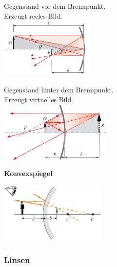 \begin{center}
	\begin{minipage}{0.3\textwidth}
		Gegenstand vor dem Brennpunkt. \\
		Erzeugt reeles Bild. \\
		\includegraphics[height=3cm,keepaspectratio=true]{Images/konkavspiegel1.png}
	\end{minipage}%
	\begin{minipage}{0.3\textwidth}
		Gegenstand hinter dem Brennpunkt. \\
		Erzeugt virtuelles Bild. \\
		\includegraphics[height=3cm,keepaspectratio=true]{Images/konkavspiegel2.png}
	\end{minipage}
\end{center}


\textbf{Konvexspiegel}
\begin{center}
	\includegraphics[height=3cm,keepaspectratio=true]{Images/konvexspiegel.png}
\end{center}

\subsubsection{Linsen}

